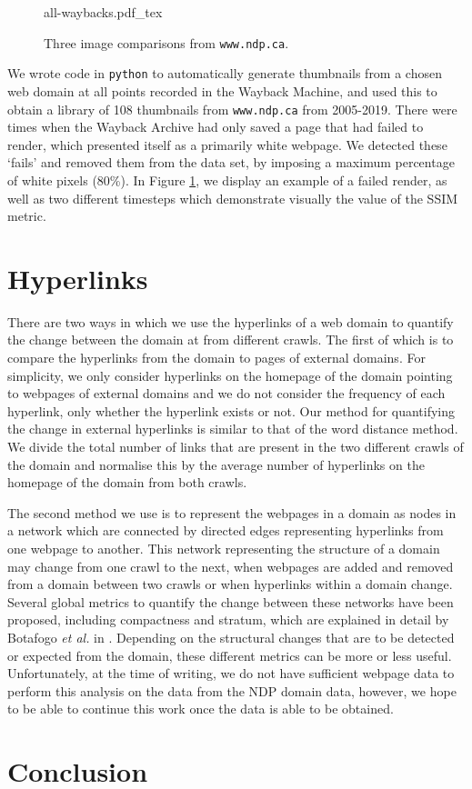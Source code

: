 \documentclass[10pt, a4paper]{article}
\begin{document}
\begin{figure}[h!]
\centering
\def\svgwidth{
0.7\columnwidth}
{all-waybacks.pdf_tex}
  \caption{Three image comparisons from \texttt{www.ndp.ca}.}
\label{fig::wayback_images}
\end{figure}

We wrote code in \texttt{python} to automatically generate thumbnails from a chosen web domain at all points recorded in the Wayback Machine, and used this to obtain a library of 108 thumbnails from \texttt{www.ndp.ca} from 2005-2019. There were times when the Wayback Archive had only saved a page that had failed to render, which presented itself as a primarily white webpage. We detected these `fails' and removed them from the data set, by imposing a maximum percentage of white pixels (80\%). In Figure \ref{fig::wayback_images}, we display an example of a failed render, as well as two different timesteps which demonstrate visually the value of the SSIM metric.
\vspace{-3mm}

\section{Hyperlinks}
\vspace{-2mm}
 There are two ways in which we use the hyperlinks of a web domain to quantify the change between the domain at from different crawls.
 The first of which is to compare the hyperlinks from the domain to pages of external domains.
 For simplicity, we only consider hyperlinks on the homepage of the domain pointing to webpages of external domains and we do not consider the frequency of each hyperlink, only whether the hyperlink exists or not.
 Our method for quantifying the change in external hyperlinks is similar to that of the word distance method.
 We divide the total number of links that are present in the two different crawls of the domain and normalise this by the average number of hyperlinks on the homepage of the domain from both crawls.
 
 The second method we use is to represent the webpages in a domain as nodes in a network which are connected by directed edges representing hyperlinks from one webpage to another.
 This network representing the structure of a domain may change from one crawl to the next, when webpages are added and removed from a domain between two crawls or when hyperlinks within a domain change.
 Several global metrics to quantify the change between these networks have been proposed, including compactness and stratum, which are explained in detail by Botafogo \textit{et al.} in \cite{botafogo1992structural}.
 Depending on the structural changes that are to be detected or expected from the domain, these different metrics can be more or less useful.
 Unfortunately, at the time of writing, we do not have sufficient webpage data to perform this analysis on the data from the NDP domain data, however, we hope to be able to continue this work once the data is able to be obtained.
\vspace{-3mm}

\section{Conclusion}
\vspace{-2mm}




\end{document}

